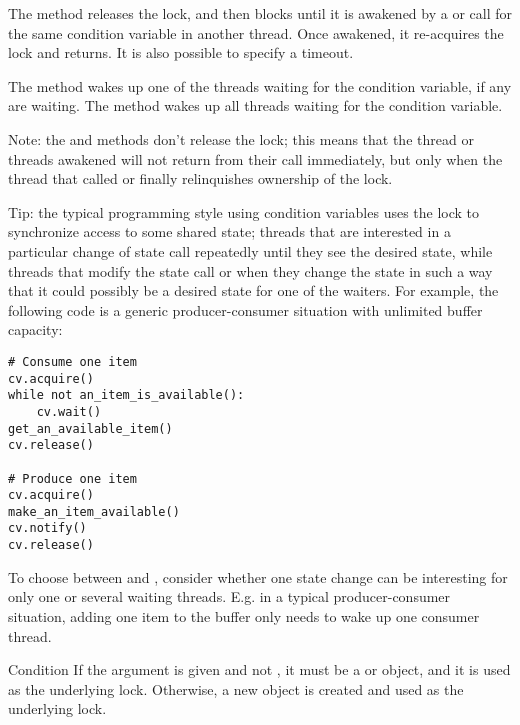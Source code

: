 The  method releases the lock, and then blocks until it
is awakened by a  or  call for
the same condition variable in another thread.  Once awakened, it
re-acquires the lock and returns.  It is also possible to specify a
timeout.

The  method wakes up one of the threads waiting for
the condition variable, if any are waiting.  The 
method wakes up all threads waiting for the condition variable.

Note: the  and  methods don't
release the lock; this means that the thread or threads awakened will
not return from their  call immediately, but only when
the thread that called  or 
finally relinquishes ownership of the lock.

Tip: the typical programming style using condition variables uses the
lock to synchronize access to some shared state; threads that are
interested in a particular change of state call 
repeatedly until they see the desired state, while threads that modify
the state call  or  when they
change the state in such a way that it could possibly be a desired
state for one of the waiters.  For example, the following code is a
generic producer-consumer situation with unlimited buffer capacity:

\begin{verbatim}
# Consume one item
cv.acquire()
while not an_item_is_available():
    cv.wait()
get_an_available_item()
cv.release()

# Produce one item
cv.acquire()
make_an_item_available()
cv.notify()
cv.release()
\end{verbatim}

To choose between  and , consider
whether one state change can be interesting for only one or several
waiting threads.  E.g. in a typical producer-consumer situation,
adding one item to the buffer only needs to wake up one consumer
thread.

\begin{classdesc}{Condition}{}
If the  argument is given and not , it must be a
 or  object, and it is used as the underlying
lock.  Otherwise, a new  object is created and used as
the underlying lock.
\end{classdesc}

